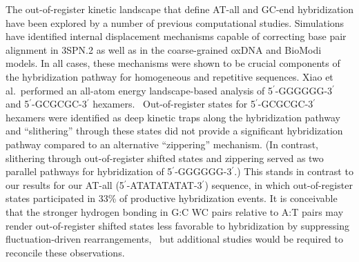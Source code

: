 \documentclass[journal=jpcbfk,manuscript=article]{achemso}
\begin{document}


The out-of-register kinetic landscape that define AT-all and GC-end hybridization have been explored by a number of previous computational studies. Simulations have identified internal displacement mechanisms capable of correcting base pair alignment in 3SPN.2 \citep{Hinckley2014Coarse-grainedEffects} as well as in the coarse-grained oxDNA \citep{Romano2013DNADependence} and BioModi \citep{Markegard2015} models. In all cases, these mechanisms were shown to be crucial components of the hybridization pathway for homogeneous and repetitive sequences. Xiao et al.\ performed an all-atom energy landscape-based analysis of 5$^\prime$-GGGGGG-3$^\prime$ and 5$^\prime$-GCGCGC-3$^\prime$ hexamers.~\citep{Xiao2019} Out-of-register states for 5$^\prime$-GCGCGC-3$^\prime$ hexamers were identified as deep kinetic traps along the hybridization pathway and ``slithering'' through these states did not provide a significant hybridization pathway compared to an alternative ``zippering'' mechanism. (In contrast, slithering through out-of-register shifted states and zippering served as two parallel pathways for hybridization of 5$^\prime$-GGGGGG-3$^\prime$.) This stands in contrast to our results for our AT-all (5$^\prime$-ATATATATAT-3$^\prime$) sequence, in which out-of-register states participated in 33\% of productive hybridization events. It is conceivable that the stronger hydrogen bonding in G:C WC pairs relative to A:T pairs may render out-of-register shifted states less favorable to hybridization by suppressing fluctuation-driven rearrangements,~\citep{Yakovchuk2006Base-stackingHelix,Zacharias2020Base-PairingFormation} but additional studies would be required to reconcile these observations.
\end{document}
